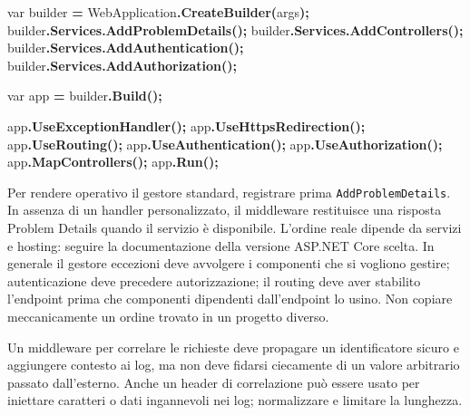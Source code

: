 \documentclass[
  italian,
  10pt,
]{book}
\newenvironment{Shaded}{\begin{snugshade}}{\end{snugshade}}
\newcommand{\DataTypeTok}[1]{\textcolor[rgb]{0.13,0.29,0.53}{#1}}
\newcommand{\FunctionTok}[1]{\textcolor[rgb]{0.13,0.29,0.53}{\textbf{#1}}}
\newcommand{\NormalTok}[1]{#1}
\newcommand{\OperatorTok}[1]{\textcolor[rgb]{0.81,0.36,0.00}{\textbf{#1}}}
\begin{document}
\begin{Shaded}
\begin{Highlighting}[]
\DataTypeTok{var}\NormalTok{ builder }\OperatorTok{=}\NormalTok{ WebApplication}\OperatorTok{.}\FunctionTok{CreateBuilder}\OperatorTok{(}\NormalTok{args}\OperatorTok{);}
\NormalTok{builder}\OperatorTok{.}\FunctionTok{Services}\OperatorTok{.}\FunctionTok{AddProblemDetails}\OperatorTok{();}
\NormalTok{builder}\OperatorTok{.}\FunctionTok{Services}\OperatorTok{.}\FunctionTok{AddControllers}\OperatorTok{();}
\NormalTok{builder}\OperatorTok{.}\FunctionTok{Services}\OperatorTok{.}\FunctionTok{AddAuthentication}\OperatorTok{();}
\NormalTok{builder}\OperatorTok{.}\FunctionTok{Services}\OperatorTok{.}\FunctionTok{AddAuthorization}\OperatorTok{();}

\DataTypeTok{var}\NormalTok{ app }\OperatorTok{=}\NormalTok{ builder}\OperatorTok{.}\FunctionTok{Build}\OperatorTok{();}

\NormalTok{app}\OperatorTok{.}\FunctionTok{UseExceptionHandler}\OperatorTok{();}
\NormalTok{app}\OperatorTok{.}\FunctionTok{UseHttpsRedirection}\OperatorTok{();}
\NormalTok{app}\OperatorTok{.}\FunctionTok{UseRouting}\OperatorTok{();}
\NormalTok{app}\OperatorTok{.}\FunctionTok{UseAuthentication}\OperatorTok{();}
\NormalTok{app}\OperatorTok{.}\FunctionTok{UseAuthorization}\OperatorTok{();}
\NormalTok{app}\OperatorTok{.}\FunctionTok{MapControllers}\OperatorTok{();}
\NormalTok{app}\OperatorTok{.}\FunctionTok{Run}\OperatorTok{();}
\end{Highlighting}
\end{Shaded}

Per rendere operativo il gestore standard, registrare prima
\texttt{AddProblemDetails}. In assenza di un handler personalizzato, il
middleware restituisce una risposta Problem Details quando il servizio è
disponibile. L'ordine reale dipende da servizi e hosting: seguire la
documentazione della versione ASP.NET Core scelta. In generale il
gestore eccezioni deve avvolgere i componenti che si vogliono gestire;
autenticazione deve precedere autorizzazione; il routing deve aver
stabilito l'endpoint prima che componenti dipendenti dall'endpoint lo
usino. Non copiare meccanicamente un ordine trovato in un progetto
diverso.

Un middleware per correlare le richieste deve propagare un
identificatore sicuro e aggiungere contesto ai log, ma non deve fidarsi
ciecamente di un valore arbitrario passato dall'esterno. Anche un header
di correlazione può essere usato per iniettare caratteri o dati
ingannevoli nei log; normalizzare e limitare la lunghezza.
\end{document}
